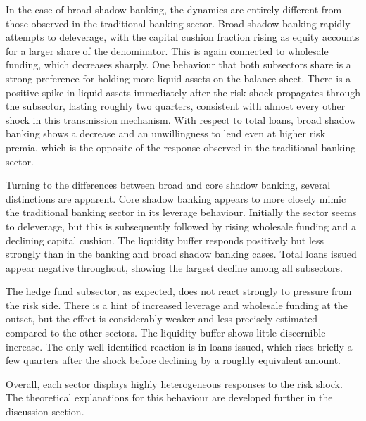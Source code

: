 \documentclass[12pt,a4paper]{report}\usepackage[a4paper, top=2.5cm, bottom=2.5cm, left=2.5cm, right=2.5cm]{geometry}
\begin{document}
In the case of broad shadow banking, the dynamics are entirely different from those observed in the traditional banking sector. Broad shadow banking rapidly attempts to deleverage, with the capital cushion fraction rising as equity accounts for a larger share of the denominator. This is again connected to wholesale funding, which decreases sharply. One behaviour that both subsectors share is a strong preference for holding more liquid assets on the balance sheet. There is a positive spike in liquid assets immediately after the risk shock propagates through the subsector, lasting roughly two quarters, consistent with almost every other shock in this transmission mechanism. With respect to total loans, broad shadow banking shows a decrease and an unwillingness to lend even at higher risk premia, which is the opposite of the response observed in the traditional banking sector.

Turning to the differences between broad and core shadow banking, several distinctions are apparent. Core shadow banking appears to more closely mimic the traditional banking sector in its leverage behaviour. Initially the sector seems to deleverage, but this is subsequently followed by rising wholesale funding and a declining capital cushion. The liquidity buffer responds positively but less strongly than in the banking and broad shadow banking cases. Total loans issued appear negative throughout, showing the largest decline among all subsectors.  

The hedge fund subsector, as expected, does not react strongly to pressure from the risk side. There is a hint of increased leverage and wholesale funding at the outset, but the effect is considerably weaker and less precisely estimated compared to the other sectors. The liquidity buffer shows little discernible increase. The only well-identified reaction is in loans issued, which rises briefly a few quarters after the shock before declining by a roughly equivalent amount.

Overall, each sector displays highly heterogeneous responses to the risk shock. The theoretical explanations for this behaviour are developed further in the discussion section.


\end{document}
